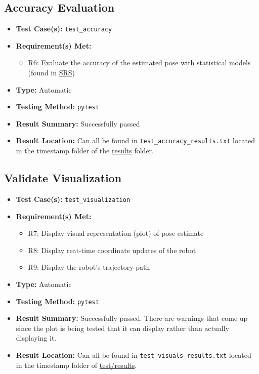 \documentclass[12pt, titlepage]{article}
\begin{document}
\subsection{Accuracy Evaluation}
\begin{itemize}
  \item \textbf{Test Case(s): }\texttt{test\_accuracy}
  \item \textbf{Requirement(s) Met: }
  \begin{itemize}
    \item R6: Evaluate the accuracy of the estimated pose with statistical models (found in \href{https://github.com/AliyahJimoh/2D-Localizer/blob/main/docs/SRS/SRS.pdf}{SRS})
  \end{itemize}
  \item \textbf{Type: }Automatic
  \item \textbf{Testing Method: }\texttt{pytest}
  \item \textbf{Result Summary: }Successfully passed
  \item \textbf{Result Location: }Can all be found in \texttt{test\_accuracy\_results.txt} located in the timestamp folder of the \href{https://github.com/AliyahJimoh/2D-Localizer/tree/main/test/results/}{results} folder.
\end{itemize}

\subsection{Validate Visualization}
\begin{itemize}
  \item \textbf{Test Case(s): }\texttt{test\_visualization}
  \item \textbf{Requirement(s) Met: }
  \begin{itemize}
    \item R7: Display visual representation (plot) of pose estimate
    \item R8: Display reat-time coordinate updates of the robot
    \item R9: Display the robot's trajectory path
  \end{itemize}
  \item \textbf{Type: }Automatic
  \item \textbf{Testing Method: }\texttt{pytest}
  \item \textbf{Result Summary: }Successfully passed. There are warnings that come up since the plot is being tested that it can display rather than actually displaying it.
  \item \textbf{Result Location: }Can all be found in \texttt{test\_visuals\_results.txt} located in the timestamp folder of \href{https://github.com/AliyahJimoh/2D-Localizer/tree/main/test/results/}{test/results}.
\end{itemize}
\end{document}
